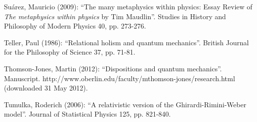 \documentclass[12pt]{article}
\theoremstyle{definition}
\begin{document}
{\vspace{0.3cm}   \noindent  Su\'arez, Mauricio (2009): ``The many metaphysics within physics: Essay Review of \emph{The metaphysics within physics} by Tim Maudlin''. Studies in History and Philosophy of Modern Physics 40, pp. 273-276. 

\vspace{0.3cm}   \noindent  Teller, Paul (1986): ``Relational holism and quantum mechanics''. British Journal for the Philosophy of Science 37, pp. 71-81.

\vspace{0.3cm}   \noindent  Thomson-Jones, Martin (2012): ``Dispositions and quantum mechanics''. Manuscript. http://www.oberlin.edu/faculty/mthomson-jones/research.html (downloaded 31 May 2012). 

\vspace{0.3cm}   \noindent  Tumulka, Roderich (2006): ``A relativistic version of the Ghirardi-Rimini-Weber model''. Journal of Statistical Physics 125, pp. 821-840.
}
\end{document}

